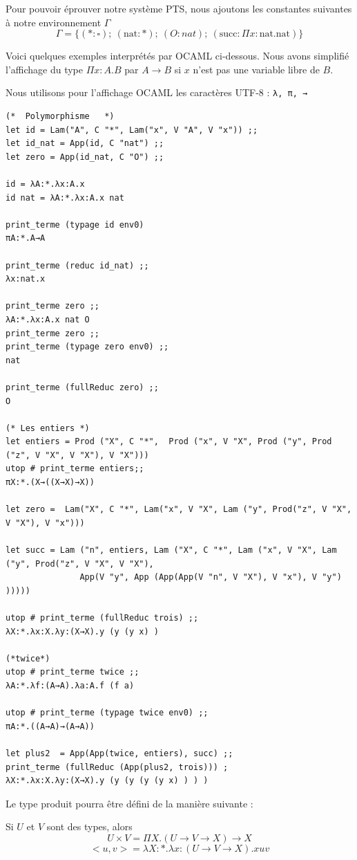 \documentclass[11pt]{book}
\begin{document}
Pour pouvoir éprouver notre système PTS, nous ajoutons les constantes suivantes à notre environnement $\Gamma$
$$\Gamma = \{ (*:\square) ;\ (\text{nat}:*) ;\ (O:nat) ;\ (\text{succ}:\Pi x:\text{nat}.\text{nat}) \} $$

Voici quelques exemples interprétés par OCAML ci-dessous. Nous avons simplifié l'affichage
du type $\Pi x:A.B$ par $A\rightarrow B$ si $x$ n'est pas une variable libre de $B$.

Nous utilisons pour l'affichage OCAML les caractères UTF-8 :  \verb+λ, π, →+

\begin{Verbatim}
(*  Polymorphisme   *)
let id = Lam("A", C "*", Lam("x", V "A", V "x")) ;;
let id_nat = App(id, C "nat") ;;
let zero = App(id_nat, C "O") ;;

id = λA:*.λx:A.x
id nat = λA:*.λx:A.x nat

print_terme (typage id env0) 
πA:*.A→A

print_terme (reduc id_nat) ;;
λx:nat.x

print_terme zero ;;
λA:*.λx:A.x nat O
print_terme zero ;;
print_terme (typage zero env0) ;;
nat

print_terme (fullReduc zero) ;;
O

(* Les entiers *)
let entiers = Prod ("X", C "*",  Prod ("x", V "X", Prod ("y", Prod ("z", V "X", V "X"), V "X")))
utop # print_terme entiers;;
πX:*.(X→((X→X)→X))

let zero =  Lam("X", C "*", Lam("x", V "X", Lam ("y", Prod("z", V "X", V "X"), V "x")))

let succ = Lam ("n", entiers, Lam ("X", C "*", Lam ("x", V "X", Lam ("y", Prod("z", V "X", V "X"),
               App(V "y", App (App(App(V "n", V "X"), V "x"), V "y") )))))

utop # print_terme (fullReduc trois) ;;
λX:*.λx:X.λy:(X→X).y (y (y x) ) 

(*twice*)
utop # print_terme twice ;;
λA:*.λf:(A→A).λa:A.f (f a) 

utop # print_terme (typage twice env0) ;;
πA:*.((A→A)→(A→A))

let plus2  = App(App(twice, entiers), succ) ;;
print_terme (fullReduc (App(plus2, trois))) ;
λX:*.λx:X.λy:(X→X).y (y (y (y (y x) ) ) )
\end{Verbatim}
Le type produit pourra être défini de la manière suivante :

Si $U$ et $V$ sont des types, alors 
$$U\times V = \Pi X.(U\rightarrow V \rightarrow X)\rightarrow X$$
$$ <u,v> = \lambda X:*.\lambda x:(U \rightarrow V \rightarrow X). x u v $$ 
\end{document}
